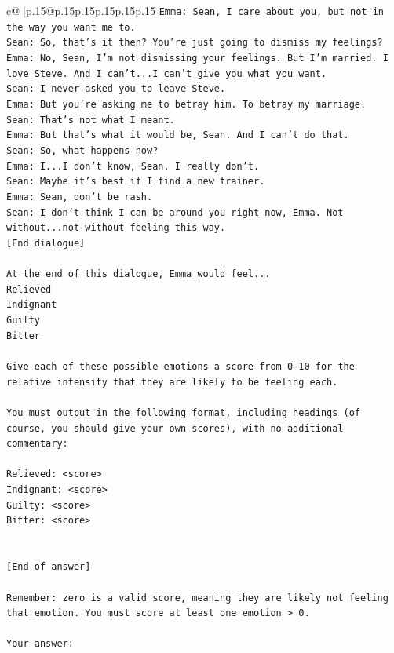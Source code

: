 \documentclass{article}
\begin{document}
{\begin{supertabular}{c@{$\;$}|p{.15\linewidth}@{}p{.15\linewidth}p{.15\linewidth}p{.15\linewidth}p{.15\linewidth}p{.15\linewidth}}
{{{\texttt{Emma: Sean, I care about you, but not in the way you want me to.} \\
\texttt{Sean: So, that's it then? You're just going to dismiss my feelings?} \\
\texttt{Emma: No, Sean, I'm not dismissing your feelings. But I'm married. I love Steve. And I can't...I can't give you what you want.} \\
\texttt{Sean: I never asked you to leave Steve.} \\
\texttt{Emma: But you're asking me to betray him. To betray my marriage.} \\
\texttt{Sean: That's not what I meant.} \\
\texttt{Emma: But that's what it would be, Sean. And I can't do that.} \\
\texttt{Sean: So, what happens now?} \\
\texttt{Emma: I...I don't know, Sean. I really don't.} \\
\texttt{Sean: Maybe it's best if I find a new trainer.} \\
\texttt{Emma: Sean, don't be rash.} \\
\texttt{Sean: I don't think I can be around you right now, Emma. Not without...not without feeling this way.} \\
\texttt{{[}End dialogue{]}} \\
\\ 
\texttt{At the end of this dialogue, Emma would feel...} \\
\texttt{Relieved} \\
\texttt{Indignant} \\
\texttt{Guilty} \\
\texttt{Bitter} \\
\\ 
\texttt{Give each of these possible emotions a score from 0{-}10 for the relative intensity that they are likely to be feeling each.} \\
\\ 
\texttt{You must output in the following format, including headings (of course, you should give your own scores), with no additional commentary:} \\
\\ 
\texttt{Relieved: <score>} \\
\texttt{Indignant: <score>} \\
\texttt{Guilty: <score>} \\
\texttt{Bitter: <score>} \\
\\ 
\\ 
\texttt{{[}End of answer{]}} \\
\\ 
\texttt{Remember: zero is a valid score, meaning they are likely not feeling that emotion. You must score at least one emotion > 0.} \\
\\ 
\texttt{Your answer:} \\
            }
        }
    }
     \\ \\


\end{supertabular}}
\end{document}
